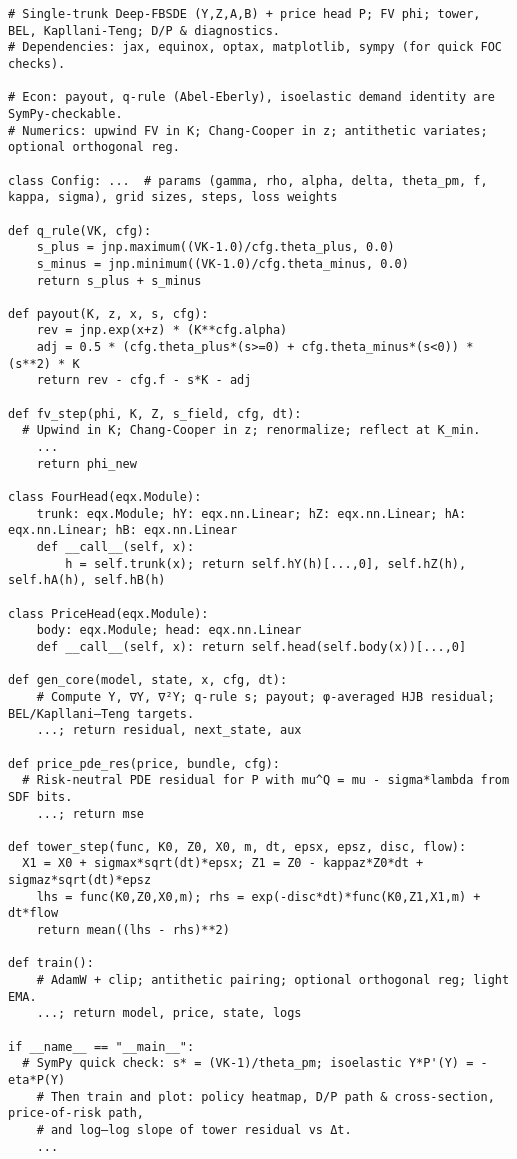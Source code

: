 ﻿\documentclass[11pt,letterpaper,oneside]{article}
\numberwithin{equation}{section}
\newcommand{\1}{\mathbf{1}}
\begin{document}
\begin{tcolorbox}[sympycheckstyle,title={Compact scaffold (illustrative; paste into a Python file)}]
\begin{Verbatim}[fontsize=\small]
# Single-trunk Deep-FBSDE (Y,Z,A,B) + price head P; FV phi; tower, BEL, Kapllani-Teng; D/P & diagnostics.
# Dependencies: jax, equinox, optax, matplotlib, sympy (for quick FOC checks).

# Econ: payout, q-rule (Abel-Eberly), isoelastic demand identity are SymPy-checkable.
# Numerics: upwind FV in K; Chang-Cooper in z; antithetic variates; optional orthogonal reg.

class Config: ...  # params (gamma, rho, alpha, delta, theta_pm, f, kappa, sigma), grid sizes, steps, loss weights

def q_rule(VK, cfg):
    s_plus = jnp.maximum((VK-1.0)/cfg.theta_plus, 0.0)
    s_minus = jnp.minimum((VK-1.0)/cfg.theta_minus, 0.0)
    return s_plus + s_minus

def payout(K, z, x, s, cfg):
    rev = jnp.exp(x+z) * (K**cfg.alpha)
    adj = 0.5 * (cfg.theta_plus*(s>=0) + cfg.theta_minus*(s<0)) * (s**2) * K
    return rev - cfg.f - s*K - adj

def fv_step(phi, K, Z, s_field, cfg, dt):
  # Upwind in K; Chang-Cooper in z; renormalize; reflect at K_min.
    ...
    return phi_new

class FourHead(eqx.Module):
    trunk: eqx.Module; hY: eqx.nn.Linear; hZ: eqx.nn.Linear; hA: eqx.nn.Linear; hB: eqx.nn.Linear
    def __call__(self, x):
        h = self.trunk(x); return self.hY(h)[...,0], self.hZ(h), self.hA(h), self.hB(h)

class PriceHead(eqx.Module):
    body: eqx.Module; head: eqx.nn.Linear
    def __call__(self, x): return self.head(self.body(x))[...,0]

def gen_core(model, state, x, cfg, dt):
    # Compute Y, ∇Y, ∇²Y; q-rule s; payout; φ-averaged HJB residual; BEL/Kapllani–Teng targets.
    ...; return residual, next_state, aux

def price_pde_res(price, bundle, cfg):
  # Risk-neutral PDE residual for P with mu^Q = mu - sigma*lambda from SDF bits.
    ...; return mse

def tower_step(func, K0, Z0, X0, m, dt, epsx, epsz, disc, flow):
  X1 = X0 + sigmax*sqrt(dt)*epsx; Z1 = Z0 - kappaz*Z0*dt + sigmaz*sqrt(dt)*epsz
    lhs = func(K0,Z0,X0,m); rhs = exp(-disc*dt)*func(K0,Z1,X1,m) + dt*flow
    return mean((lhs - rhs)**2)

def train():
    # AdamW + clip; antithetic pairing; optional orthogonal reg; light EMA.
    ...; return model, price, state, logs

if __name__ == "__main__":
  # SymPy quick check: s* = (VK-1)/theta_pm; isoelastic Y*P'(Y) = -eta*P(Y)
    # Then train and plot: policy heatmap, D/P path & cross-section, price-of-risk path,
    # and log–log slope of tower residual vs Δt.
    ...
\end{Verbatim}
\end{tcolorbox}
\end{document}
